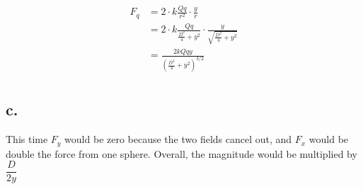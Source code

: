 \documentclass{article}
\begin{document}
\begin{align*}
  F_q &= 2 \cdot k \frac{Qq}{r^2} \cdot \frac{y}{r} \\
  &= 2 \cdot k \frac{Qq}{\frac{D^2}{4}+y^2} \cdot \frac{y}{\sqrt{\frac{D^2}{4}+y^2}} \\
  &=  \frac{2kQqy}{\left(\frac{D^2}{4}+y^2\right)^{3/2}} \\
\end{align*}

\subsection*{c.}

This time $F_y$ would be zero because the two fields cancel out, and $F_x$ would be double the force from one sphere. Overall, the magnitude would be 
multiplied by $\dfrac{D}{2y}$
\end{document}
